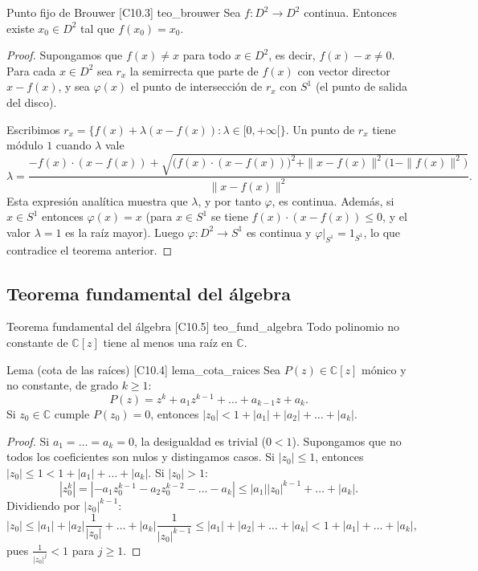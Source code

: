 \begin{teorema}{Punto fijo de Brouwer [C10.3] \marcaT}{teo_brouwer}
Sea $f \colon D^2 \to D^2$ continua. Entonces existe $x_0 \in D^2$ tal que $f(x_0) = x_0$.
\end{teorema}

\begin{proof}
Supongamos que $f(x) \neq x$ para todo $x \in D^2$, es decir, $f(x) - x \neq 0$. Para cada $x \in D^2$ sea $r_x$ la semirrecta que parte de $f(x)$ con vector director $x - f(x)$, y sea $\varphi(x)$ el punto de intersección de $r_x$ con $S^1$ (el punto de salida del disco).

Escribimos $r_x = \{ f(x) + \lambda (x - f(x)) : \lambda \in [0,+\infty[ \}$. Un punto de $r_x$ tiene módulo $1$ cuando $\lambda$ vale
\[ \lambda = \frac{-f(x) \cdot (x - f(x)) + \sqrt{\big(f(x) \cdot (x - f(x))\big)^2 + \|x - f(x)\|^2 \big(1 - \|f(x)\|^2\big)}}{\|x - f(x)\|^2}. \]
Esta expresión analítica muestra que $\lambda$, y por tanto $\varphi$, es continua. Además, si $x \in S^1$ entonces $\varphi(x) = x$ (para $x \in S^1$ se tiene $f(x)\cdot(x-f(x)) \le 0$, y el valor $\lambda = 1$ es la raíz mayor). Luego $\varphi \colon D^2 \to S^1$ es continua y $\varphi|_{S^1} = 1_{S^1}$, lo que contradice el teorema anterior.
\end{proof}

\subsection{Teorema fundamental del álgebra}

\begin{teorema}{Teorema fundamental del álgebra [C10.5] \marcaT}{teo_fund_algebra}
Todo polinomio no constante de $\mathbb{C}[z]$ tiene al menos una raíz en $\mathbb{C}$.
\end{teorema}

\begin{proposicion}{Lema (cota de las raíces) [C10.4] \marcaL}{lema_cota_raices}
Sea $P(z) \in \mathbb{C}[z]$ mónico y no constante, de grado $k \geq 1$:
\[ P(z) = z^k + a_1 z^{k-1} + \dots + a_{k-1} z + a_k. \]
Si $z_0 \in \mathbb{C}$ cumple $P(z_0) = 0$, entonces $|z_0| < 1 + |a_1| + |a_2| + \dots + |a_k|$.
\end{proposicion}

\begin{proof}
Si $a_1 = \dots = a_k = 0$, la desigualdad es trivial ($0 < 1$). Supongamos que no todos los coeficientes son nulos y distingamos casos. Si $|z_0| \leq 1$, entonces $|z_0| \leq 1 < 1 + |a_1| + \dots + |a_k|$. Si $|z_0| > 1$:
\[ |z_0^k| = |-a_1 z_0^{k-1} - a_2 z_0^{k-2} - \dots - a_k| \leq |a_1||z_0|^{k-1} + \dots + |a_k|. \]
Dividiendo por $|z_0|^{k-1}$:
\[ |z_0| \leq |a_1| + |a_2|\frac{1}{|z_0|} + \dots + |a_k| \frac{1}{|z_0|^{k-1}} \leq |a_1| + |a_2| + \dots + |a_k| < 1 + |a_1| + \dots + |a_k|, \]
pues $\frac{1}{|z_0|^j} < 1$ para $j \geq 1$.
\end{proof}

